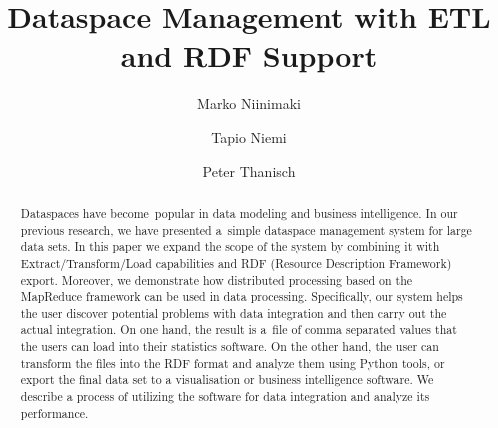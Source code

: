 \documentclass[USenglish,twocolumn]{article}
\begin{document}
 


  \author*[1]{Marko Niinimaki}

  \author[2]{Tapio Niemi}

  \author[3]{Peter Thanisch}




  \title{\huge Dataspace Management with ETL and RDF Support}



  \begin{abstract}
Dataspaces have become~popular in data modeling and
business intelligence. In our previous research, we have presented
a~simple dataspace management system for large data sets. In this paper
we expand the scope of the system by combining it with
Extract/Transform/Load capabilities and RDF (Resource Description
Framework) export. Moreover, we demonstrate how distributed processing
based on the MapReduce framework can be used in data processing.
Specifically, our system helps the user discover potential problems with
data integration and then carry out the actual integration. On one hand,
the result is a~file of comma separated values that the users can load
into their statistics software. On the other hand, the user can
transform the files into the RDF format and analyze them using Python
tools, or export the final data set to a visualisation or business
intelligence software. We describe a process of utilizing the software
for data integration and analyze its performance.
\end{abstract}



 
\end{document}
